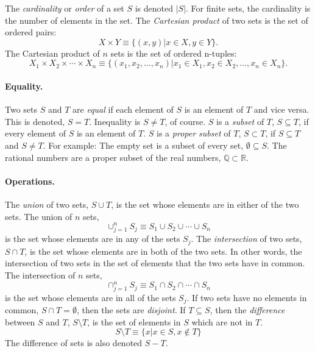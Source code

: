 The \textit{cardinality} or \textit{order} of a set $S$ is denoted $|S|$.
For finite sets, the cardinality is the number of elements in the set.
The \textit{Cartesian product} of two sets is the set of ordered pairs:
\[
X \times Y \equiv \{ (x,y) | x \in X, y \in Y \}.
\]
The Cartesian product of $n$ sets is the set of ordered n-tuples:
\[
X_1 \times X_2 \times \cdots \times X_n \equiv \{ (x_1,x_2,\ldots,x_n) | x_1 \in X_1, x_2 \in X_2, \ldots, x_n \in X_n \}.
\]


\paragraph{Equality.}
Two sets $S$ and $T$ are \textit{equal} if each element of $S$ is an element 
of $T$ and vice versa.  This is denoted, $S = T$.  Inequality is
$S \neq T$, of course.
$S$ is a \textit{subset}
of $T$, $S \subseteq T$, if every element of $S$ is an element of $T$.
$S$ is a \textit{proper subset}
of $T$, $S \subset T$, if $S \subseteq T$ and $S \neq T$.
For example: The empty set is a subset of every set, $\emptyset \subseteq S$.
The rational numbers are a proper subset of the real numbers, 
$\mathbb{Q} \subset \mathbb{R}$.


\paragraph{Operations.}
The \textit{union} of two sets, $S \cup T$,  is the set whose elements are 
in either of the two sets.
The union of $n$ sets,
\[
\cup_{j=1}^n S_j \equiv S_1 \cup S_2 \cup \cdots \cup S_n
\]
is the set whose elements are in any of the sets $S_j$.
The \textit{intersection} of two sets, $S \cap T$,  is the set whose 
elements are in both of the two sets.  In other words, the intersection of
two sets in the set of elements that the two sets have in common.
The intersection of $n$ sets,
\[
\cap_{j=1}^n S_j \equiv S_1 \cap S_2 \cap \cdots \cap S_n
\]
is the set whose elements are in all of the sets $S_j$.
If two sets have no elements in common, $S \cap T = \emptyset$, then 
the sets are \textit{disjoint}.
If $T \subseteq S$, then the \textit{difference} between $S$ and $T$,
$S \setminus T$, is the set of elements in $S$ which are not in $T$.
\[
S \setminus T \equiv \{x | x \in S, x \not\in T \}
\]
The difference of sets is also denoted $S - T$.


